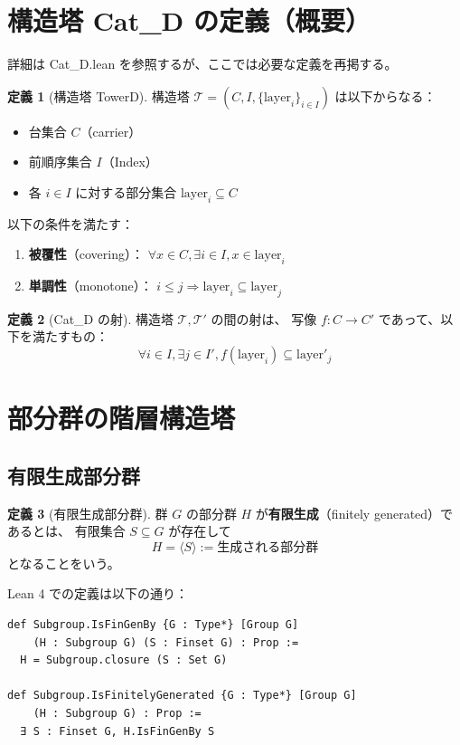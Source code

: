 \documentclass[a4paper,12pt]{ltjsarticle}
\theoremstyle{definition}
\newtheorem{definition}{定義}[section]
\begin{document}
\section{構造塔 Cat\_D の定義（概要）}

詳細は Cat\_D.lean を参照するが、ここでは必要な定義を再掲する。

\begin{definition}[構造塔 TowerD]
構造塔 $\mathcal{T} = (C, I, \{\text{layer}_i\}_{i \in I})$ は以下からなる：
\begin{itemize}
  \item 台集合 $C$（carrier）
  \item 前順序集合 $I$（Index）
  \item 各 $i \in I$ に対する部分集合 $\text{layer}_i \subseteq C$
\end{itemize}
以下の条件を満たす：
\begin{enumerate}
  \item \textbf{被覆性}（covering）：
    $\forall x \in C, \exists i \in I, x \in \text{layer}_i$
  \item \textbf{単調性}（monotone）：
    $i \leq j \Rightarrow \text{layer}_i \subseteq \text{layer}_j$
\end{enumerate}
\end{definition}

\begin{definition}[Cat\_D の射]
構造塔 $\mathcal{T}, \mathcal{T}'$ の間の射は、
写像 $f : C \to C'$ であって、以下を満たすもの：
\[
\forall i \in I, \exists j \in I',
f(\text{layer}_i) \subseteq \text{layer}'_j
\]
\end{definition}

\section{部分群の階層構造塔}

\subsection{有限生成部分群}

\begin{definition}[有限生成部分群]
群 $G$ の部分群 $H$ が\textbf{有限生成}（finitely generated）であるとは、
有限集合 $S \subseteq G$ が存在して
\[
H = \langle S \rangle := \text{生成される部分群}
\]
となることをいう。
\end{definition}

Lean 4 での定義は以下の通り：
\begin{verbatim}
def Subgroup.IsFinGenBy {G : Type*} [Group G]
    (H : Subgroup G) (S : Finset G) : Prop :=
  H = Subgroup.closure (S : Set G)

def Subgroup.IsFinitelyGenerated {G : Type*} [Group G]
    (H : Subgroup G) : Prop :=
  ∃ S : Finset G, H.IsFinGenBy S
\end{verbatim}
\end{document}
